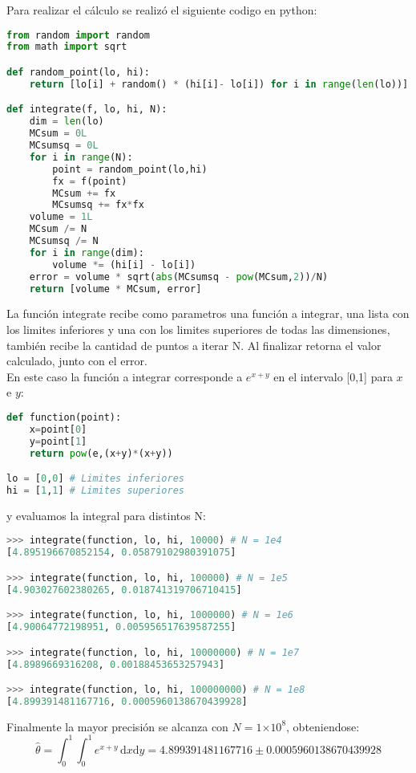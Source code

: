 \documentclass[letter, 10pt]{article}
\providecommand{\e}[1]{\ensuremath{\times 10^{#1}}}
\begin{document}
Para realizar el c\'alculo se realiz\'o el siguiente codigo en python:\\
\begin{lstlisting}[language=Python]
from random import random
from math import sqrt

def random_point(lo, hi):
    return [lo[i] + random() * (hi[i]- lo[i]) for i in range(len(lo))]

def integrate(f, lo, hi, N):
    dim = len(lo)
    MCsum = 0L
    MCsumsq = 0L
    for i in range(N):
        point = random_point(lo,hi)
        fx = f(point)
        MCsum += fx
        MCsumsq += fx*fx
    volume = 1L
    MCsum /= N
    MCsumsq /= N
    for i in range(dim):
        volume *= (hi[i] - lo[i])
    error = volume * sqrt(abs(MCsumsq - pow(MCsum,2))/N)
    return [volume * MCsum, error]
\end{lstlisting}
La funci\'on integrate recibe como parametros una funci\'on a integrar, una lista con los limites inferiores y una con los limites superiores de todas las dimensiones,
tambi\'en recibe la cantidad de puntos a iterar N. Al finalizar retorna el valor calculado, junto con el error.\\
En este caso la funci\'on a integrar corresponde a $e^{x+y}$ en el intervalo [0,1] para $x$ e $y$:
\begin{lstlisting}[language=Python]
def function(point):
    x=point[0]
    y=point[1]
    return pow(e,(x+y)*(x+y))

lo = [0,0] # Limites inferiores
hi = [1,1] # Limites superiores
\end{lstlisting}
y evaluamos la integral para distintos N:
\begin{lstlisting}[language=Python]
>>> integrate(function, lo, hi, 10000) # N = 1e4
[4.895196670852154, 0.05879102980391075]

>>> integrate(function, lo, hi, 100000) # N = 1e5
[4.903027602380265, 0.018741319706710415]

>>> integrate(function, lo, hi, 1000000) # N = 1e6
[4.90064772198951, 0.005956517639587255]

>>> integrate(function, lo, hi, 10000000) # N = 1e7
[4.8989669316208, 0.00188453653257943]

>>> integrate(function, lo, hi, 100000000) # N = 1e8
[4.899391481167716, 0.0005960138670439928]
\end{lstlisting}

Finalmente la mayor precisi\'on se alcanza con $N = 1 \e{8}$, obteniendose:
$$\hat{\theta} =\int_0^1 \int_0^1 \! e^{x+y} \, \mathrm{d} x\mathrm{d} y = 4.899391481167716 \pm 0.0005960138670439928$$
\end{document}
